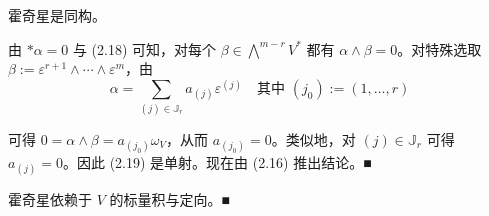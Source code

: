 \begin{remark}

\begin{items}
\item

霍奇星是同构。

\proofhead
由 $ \ast\alpha = 0 $ 与 (2.18) 可知，对每个 $ \beta \in \bigwedge^{m-r}V^{*} $ 都有 $ \alpha \wedge \beta = 0 $。对特殊选取 $ \beta := \varepsilon^{r+1} \wedge \cdots \wedge \varepsilon^{m} $，由
\[
\alpha = \sum_{(j)\in\mathbb{J}_r} a_{(j)}\varepsilon^{(j)} \quad \text{其中 } (j_0) := (1,\ldots,r)
\]

可得 $ 0 = \alpha \wedge \beta = a_{(j_0)}\omega_V $，从而 $ a_{(j_0)} = 0 $。类似地，对 $ (j) \in \mathbb{J}_r $ 可得 $ a_{(j)} = 0 $。因此 (2.19) 是单射。现在由 (2.16) 推出结论。\nobreak\hspace{0.35em}■

\item

霍奇星依赖于 $ V $ 的标量积与定向。\nobreak\hspace{0.35em}■

\end{items}

\end{remark}


